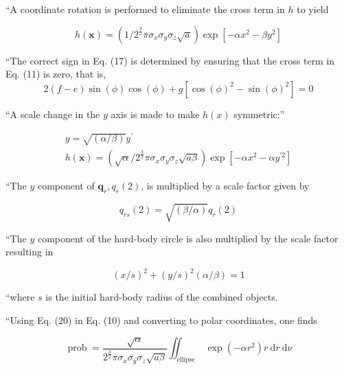 ``A coordinate rotation is performed to eliminate the cross term in $h$ to yield

\begin{equation}
    h(\boldsymbol{x})=\left(1 / 2^{\frac{3}{2}} \pi \sigma_{x} \sigma_{y} \sigma_{z} \sqrt{a}\right) \exp \left[-\alpha x^{2}-\beta y^{2}\right]
\end{equation}

``The correct sign in Eq. (17) is determined by ensuring that the cross term in Eq. (11) is zero, that is,
\begin{equation}
    2(f-e) \sin (\phi) \cos (\phi)+g\left[\cos (\phi)^{2}-\sin (\phi)^{2}\right]=0
\end{equation}

``A scale change in the $y$ axis is made to make $h(x)$ symmetric:''

\begin{equation}
    \begin{gathered}
        y=\sqrt{(\alpha / \beta)} y^{\prime} \\
        h(\boldsymbol{x})=\left(\sqrt{\alpha} / 2^{\frac{3}{2}} \pi \sigma_{x} \sigma_{y} \sigma_{z} \sqrt{a \beta}\right) \exp \left[-\alpha x^{2}-\alpha y^{\prime 2}\right]
    \end{gathered}
\end{equation}

``The $y$ component of $\boldsymbol{q}_{r}, q_{r}(2)$, is multiplied by a scale factor given by

\begin{equation}
    q_{r s}(2)=\sqrt{(\beta / \alpha)} q_{r}(2)
\end{equation}

``The $y$ component of the hard-body circle is also multiplied by the scale factor resulting in


\begin{equation}
    (x / s)^{2}+(y / s)^{2}(\alpha / \beta)=1
\end{equation}

``where $s$ is the initial hard-body radius of the combined objects.

``Using Eq. (20) in Eq. (10) and converting to polar coordinates, one finds

\begin{equation}
    \operatorname{prob}=\frac{\sqrt{\alpha}}{2^{\frac{3}{2}} \pi \sigma_{x} \sigma_{y} \sigma_{z} \sqrt{a \beta}} \iint_{\text {ellipse }} \exp \left(-\alpha r^{2}\right) r \mathrm{~d} r \mathrm{~d} \nu
\end{equation}

